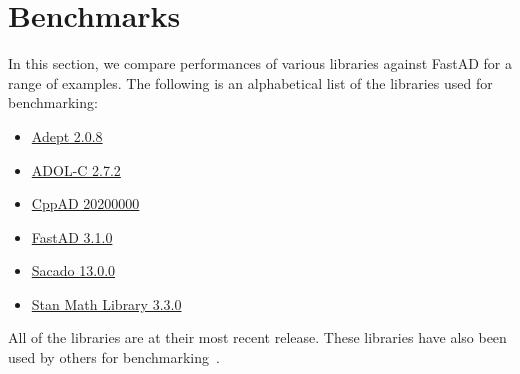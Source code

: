 \section{Benchmarks}\label{sec:benchmark}

In this section, we compare performances of 
various libraries against FastAD for a range of examples\footnotemark.
The following is an alphabetical list of the libraries used for benchmarking:\@
\begin{itemize}
    \item \href{http://www.met.reading.ac.uk/clouds/adept/}{Adept 2.0.8}
    \item \href{https://github.com/coin-or/ADOL-C}{ADOL-C 2.7.2}
    \item \href{https://coin-or.github.io/CppAD/doc/cppad.htm}{CppAD 20200000}
    \item \href{https://github.com/JamesYang007/FastAD}{FastAD 3.1.0}
    \item \href{https://github.com/trilinos/Trilinos/tree/master/packages/sacado}{Sacado 13.0.0}
    \item \href{https://github.com/stan-dev/math}{Stan Math Library 3.3.0}
\end{itemize}
All of the libraries are at their most recent release.
These libraries have also been used by others for 
benchmarking~\cite{carpenter:2015}\cite{margossian:2018}\cite{hogan:2014}.

